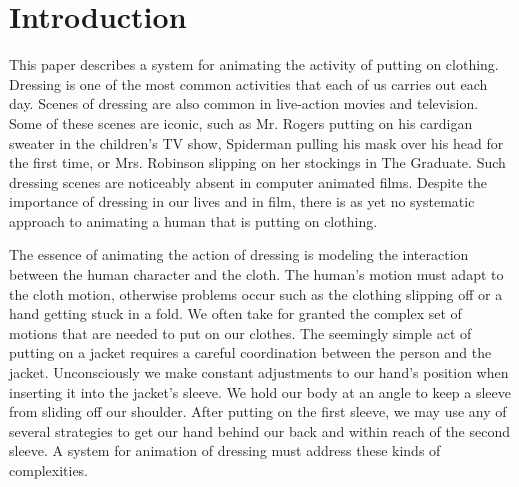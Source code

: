\section{Introduction}



This paper describes a system for animating the activity of putting on
clothing.  Dressing is one of the most common activities that each of us
carries out each day.  Scenes of dressing are also common in live-action
movies and television.  Some of these scenes are iconic, such as Mr.
Rogers putting on his cardigan sweater in the children’s TV show,
Spiderman pulling his mask over his head for the first time, or Mrs.
Robinson slipping on her stockings in The Graduate.  Such dressing scenes
are noticeably absent in computer animated films.  Despite the importance
of dressing in our lives and in film, there is as yet no systematic
approach to animating a human that is putting on clothing.


The essence of animating the action of dressing is modeling the
interaction between the human character and the cloth.  The human's motion
must adapt to the cloth motion, otherwise problems occur such as the
clothing slipping off or a hand getting stuck in a fold.  We often take
for granted the complex set of motions that are needed to put on our
clothes.  The seemingly simple act of putting on a jacket requires a
careful coordination between the person and the jacket.  Unconsciously we
make constant adjustments to our hand’s position when inserting it into
the jacket’s sleeve.  We hold our body at an angle to keep a sleeve from
sliding off our shoulder.  After putting on the first sleeve, we may use
any of several strategies to get our hand behind our back and within reach
of the second sleeve.  A system for animation of dressing must address
these kinds of complexities.

